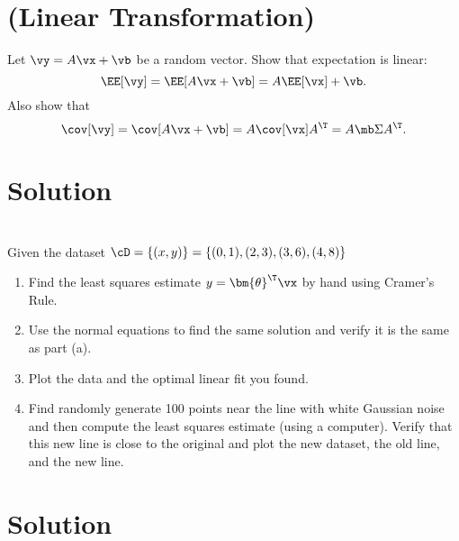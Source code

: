 \documentclass[189]{pset}
\begin{document}

  \section{(Linear Transformation)}
    Let $\vy = A \vx + \vb$ be a random vector. Show that
    expectation is linear:
    \[
      \EE[\vy] = \EE[A\vx + \vb] = A\EE[\vx] + \vb.
    \]
    Also show that
    \[
      \cov[\vy] = \cov[A\vx + \vb] = A \cov[\vx] A^\T = A\mb\Sigma A^\T.
    \]

  \hrulefill

  \section*{Solution}

  \clearpage


  \section{}
    Given the dataset $\cD = \{(x,y)\} = \{(0,1), (2,3), (3,6), (4,8)\}$
    \begin{enumerate}
      \item Find the least squares estimate $y = {\bm{\theta}}^\T\vx$ by
        hand using Cramer's Rule.
      \item Use the normal equations to find the same solution and
        verify it is the same as part (a).
      \item Plot the data and the optimal linear fit you found.
      \item Find randomly generate 100 points near the line with white
        Gaussian noise and then compute the least squares estimate
        (using a computer). Verify that this new line is close to the
        original and plot the new dataset, the old line, and the new
        line.
    \end{enumerate}

  \hrulefill

  \section*{Solution}
\end{document}
